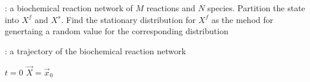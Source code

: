 \begin{algorithm}[H]
\DontPrintSemicolon
{}

\caption{\protect\TitleFunction{}}
\label{algo:ssssa}

\Input: a biochemical reaction network of $M$ reactions and $N$ species.
Partition the state into $X^f$ and $X^s$. Find the stationary distribution for $X^f$ as the mehod for genertaing a random value for the corresponding distribution\;

\Output: a trajectory of the biochemical reaction network\;

$t = 0$\;
$\vec{X} = \vec{x}_0$\;

\end{algorithm}
